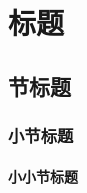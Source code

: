 \maketitle
\frontmatter

\tableofcontents

\mainmatter















\chapter{标题}
\section{节标题}
\subsection{小节标题}
\subsubsection{小小节标题}

\appendix




